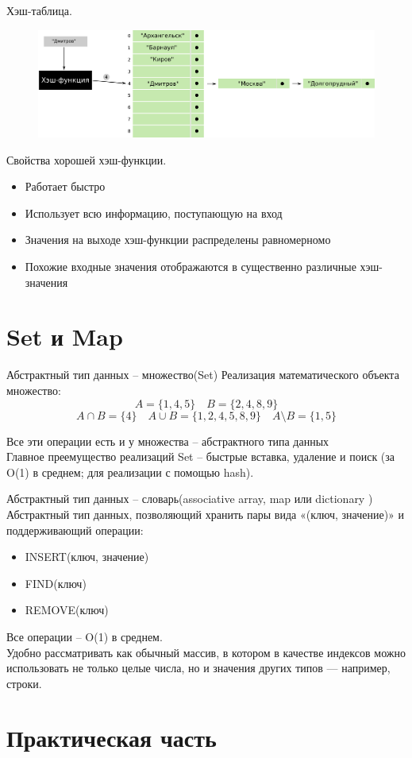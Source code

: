 \documentclass[10pt]{beamer}
\begin{document}
\begin{frame}{Хэш-таблица.}
\begin{figure}
\centerline{\includegraphics[width=0.99\linewidth]{images/hash_9.png}}
\end{figure}
\end{frame}


\begin{frame}{Свойства хорошей хэш-функции.}
\begin{itemize}
\item Работает быстро
\item Использует всю информацию, поступающую на вход
\item Значения на выходе хэш-функции распределены равномерномо
\item Похожие входные значения отображаются в существенно различные хэш-значения
\end{itemize}
\end{frame}


\section{Set и Map}

\begin{frame}{Абстрактный тип данных -- множество(Set)}
Реализация математического объекта множество:
$$
A = \{1, 4, 5\} \quad B = \{2, 4, 8, 9\}
$$
$$
A \cap B = \{4\} \quad A \cup B = \{1, 2, 4, 5, 8, 9\} \quad A \setminus B = \{1, 5\}
$$

Все эти операции есть и у множества -- абстрактного типа данных \\
Главное преемущество реализаций Set -- быстрые вставка, удаление и поиск (за O(1) в среднем; для реализации с помощью hash).
\end{frame}



\begin{frame}{Абстрактный тип данных -- словарь(associative array, map или dictionary )}
Абстрактный тип данных, позволяющий хранить пары вида «(ключ, значение)» и поддерживающий операции:
\begin{itemize}
\item INSERT(ключ, значение)
\item FIND(ключ)
\item REMOVE(ключ)
\end{itemize}
Все операции -- O(1) в среднем. \\
Удобно рассматривать как обычный массив, в котором в качестве индексов можно использовать не только целые числа, но и значения других типов — например, строки.
\end{frame}



\section{Практическая часть}
\end{document}
